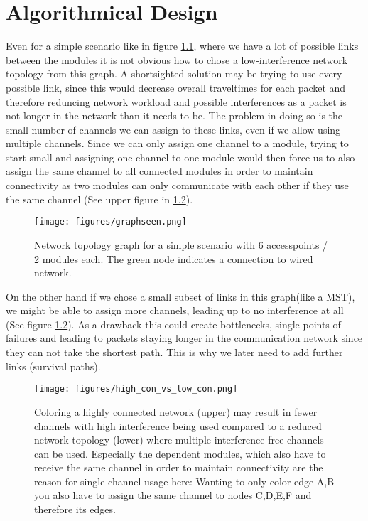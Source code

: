 \chapter{Algorithmical Design}
  Even for a simple scenario like in figure \ref{fig:graphseen}, where we have a lot of possible links between the modules it is not obvious how to
  chose a low-interference network topology from this graph.
  A shortsighted solution may be trying to use every possible link, since this would decrease overall traveltimes for each packet and therefore
  reduncing network workload and possible interferences as a packet is not longer in the network than it needs to be. 
  The problem in doing so is the small number of channels we can assign to these links, even if we allow using multiple channels.
  Since we can only assign one channel to a module, trying to start small and assigning one channel to one module would then force us to also 
  assign the same channel to all connected modules in order to maintain connectivity as two modules can only communicate with each other if they use the same channel
  (See upper figure in \ref{fig:high_con_vs_low_con}). 
  
  \begin{figure}[h!]
    \centering
    \texttt{[image: figures/graphseen.png]}
    \caption{Network topology graph for a simple scenario with 6 accesspoints / 2 modules each. The green node indicates a connection to wired network.}
    \label{fig:graphseen}
  \end{figure}

  On the other hand if we chose a small subset of links in this graph(like a \ac{MST}), we might be able to 
  assign more channels, leading up to no interference at all (See figure \ref{fig:high_con_vs_low_con}).
  As a drawback this could create bottlenecks, single points of failures and leading to packets staying longer in the 
  communication network since they can not take the shortest path. This is why we later need to add further links (survival paths).

  \begin{figure}[h!]
    \centering
    \texttt{[image: figures/high\_con\_vs\_low\_con.png]}
    \caption{Coloring a highly connected network (upper) may result in fewer channels with high interference being used compared to 
      a reduced network topology (lower) where multiple interference-free channels can be used. Especially the dependent modules, which also have to receive the same channel
      in order to maintain connectivity are the reason for single channel usage here: Wanting to only color edge A,B you also have to assign the same channel to nodes C,D,E,F
      and therefore its edges.}
    \label{fig:high_con_vs_low_con}
  \end{figure}
  
